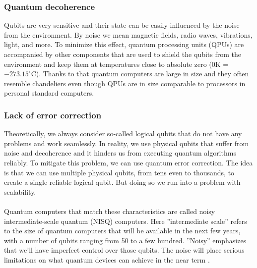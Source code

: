 \subsubsection{Quantum decoherence}
Qubits are very sensitive and their state can be easily influenced by the noise from the environment. By noise we mean magnetic fields, radio waves, vibrations, light, and more. To minimize this effect, quantum processing units (QPUs) are accompanied by other components that are used to shield the qubits from the environment and keep them at temperatures close to absolute zero ($0$K = $-273.15^{\circ}$C). Thanks to that quantum computers are large in size and they often resemble chandeliers even though QPUs are in size comparable to processors in personal standard computers.

\subsubsection{Lack of error correction}
Theoretically, we always consider so-called logical qubits that do not have any problems and work seamlessly. In reality, we use physical qubits that suffer from noise and decoherence and it hinders us from executing quantum algorithms reliably. To mitigate this problem, we can use quantum error correction. The idea is that we can use multiple physical qubits, from tens even to thousands, to create a single reliable logical qubit. But doing so we run into a problem with scalability. 

\paragraph{}
Quantum computers that match these characteristics are called noisy intermediate-scale quantum (NISQ) computers. Here ''intermediate scale'' refers to the size of quantum computers that will be available in the next few years, with a number of qubits ranging from 50 to a few hundred. ''Noisy'' emphasizes that we'll have imperfect control over those qubits. The noise will place serious limitations on what quantum devices can achieve in the near term \cite{preskill_nisq}.